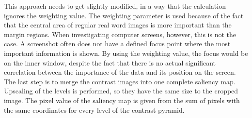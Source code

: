 \documentclass[draft,final]{vutinfth} %
\begin{document}
	This approach needs to get slightly modified, in a way that the calculation ignores the weighting value.
	The weighting parameter is used because of the fact that the central area of regular real word images is more important than the margin regions.
	When investigating computer screens, however, this is not the case.
	A screenshot often does not have a defined focus point where the most important information is shown.
	By using the weighting value, the focus would be on the inner window, despite the fact that there is no actual significant correlation between the importance of the data and its position on the screen.
	The last step is to merge the contrast images into one complete saliency map.
	Upscaling of the levels is performed, so they have the same size to the cropped image.
	The pixel value of the saliency map is given from the sum of pixels with the same coordinates for every level of the contrast pyramid.\par
	
\end{document}
